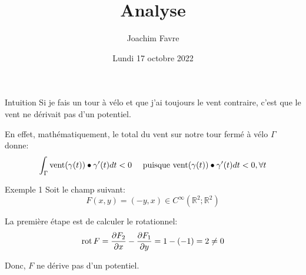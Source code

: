 \documentclass[a4paper]{article}
\title{Analyse}
\author{Joachim Favre}
\date{Lundi 17 octobre 2022}
\begin{document}
\maketitle


\begin{parag}{Intuition}
    Si je fais un tour à vélo et que j'ai toujours le vent contraire, c'est que le vent ne dérivait pas d'un potentiel.

    En effet, mathématiquement, le total du vent sur notre tour fermé à vélo $\Gamma$ donne: 
    \[\int_{\Gamma} \text{vent}\left(\gamma\left(t\right)\right) \dotprod \gamma'\left(t\right) dt < 0 \mathspace \text{ puisque } \text{vent}\left(\gamma\left(t\right)\right) \dotprod \gamma'\left(t\right) dt < 0, \forall t\]
\end{parag}

\begin{parag}{Exemple 1}
    Soit le champ suivant: 
    \[F\left(x, y\right) = \left(-y, x\right) \in C^{\infty}\left(\mathbb{R}^2; \mathbb{R}^2\right)\]
    
    La première étape est de calculer le rotationnel: 
    \[\rot F = \frac{\partial F_2}{\partial x} - \frac{\partial F_1}{\partial y} = 1 - \left(-1\right) = 2 \neq 0\]
    
    Donc, $F$ ne dérive pas d'un potentiel.
\end{parag}
\end{document}
